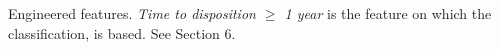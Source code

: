Engineered features. \textit{Time to disposition $\geq$ 1 year} is the feature on which the classification, is based. See Section 6.
\label{tab:Features}